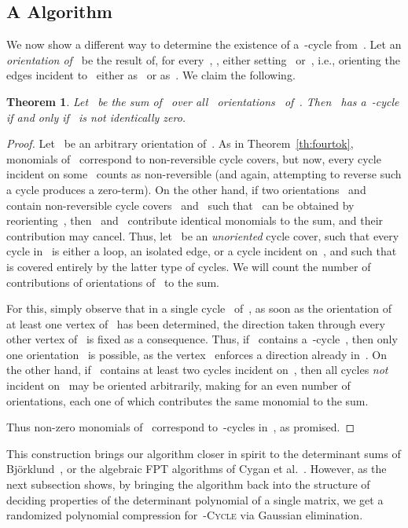 \documentclass[a4paper,11pt]{article}
\newtheorem{theorem}{Theorem}
\begin{document}
\subsection{A  Algorithm}

We now show a different way to determine the existence of a~-cycle from~. 
Let an \emph{orientation of~} be the result of, for every~, , either
setting~ or~, i.e., orienting the edges
incident to~ either as~ or as~. We claim the following.

\begin{theorem}
\label{th:reorient}
Let~ be the sum of~ over all~ orientations~ of~. 
Then~ has a~-cycle if and only if~ is not identically zero.
\end{theorem}
\begin{proof}
Let~ be an arbitrary orientation of~. As in Theorem~\ref{th:fourtok}, monomials
of~ correspond to non-reversible cycle covers, but now, every cycle incident on
some~ counts as non-reversible (and again, attempting to reverse such a cycle
produces a zero-term). On the other hand, if two orientations~ and~ contain
non-reversible cycle covers~ and~ such that~ can be obtained by
reorienting~, then~ and~ contribute identical monomials to the sum, and
their contribution may cancel. Thus, let~ be an \emph{unoriented} cycle cover, such
that every cycle in~ is either a loop, an isolated edge, or a cycle incident on~,
and such that~ is covered entirely by the latter type of cycles. We will count the
number of contributions of orientations of~ to the sum. 

For this, simply observe that in a single cycle~ of~, as soon as the orientation
of at least one vertex of~ has been determined, the direction taken through every other
vertex of~ is fixed as a consequence. Thus, if~ contains a~-cycle~, then
only one orientation~ is possible, as the vertex~ enforces a direction already
in~. On the other hand, if~ contains at least two cycles incident on~, then
all cycles \emph{not} incident on~ may be oriented arbitrarily, making for an even
number of orientations, each one of which contributes the same monomial to the sum. 

Thus non-zero monomials of~ correspond to~-cycles in~, as promised. 
\end{proof}

This construction brings our algorithm closer in spirit to the determinant sums of
Bj\"orklund~\cite{Bjorklund10a,Bjorklund10b}, or the algebraic FPT algorithms of Cygan et
al.~\cite{CyganNPPvRW11}. However, as the next subsection shows, by bringing the algorithm
back into the structure of deciding properties of the determinant polynomial of a single
matrix, we get a randomized polynomial compression for~\textsc{-Cycle} via Gaussian
elimination. 
\end{document}
